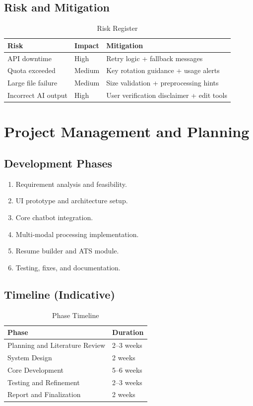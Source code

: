 \documentclass[12pt,a4paper]{report}
\begin{document}
\section{Risk and Mitigation}
\begin{table}[H]
\centering
\caption{Risk Register}
\begin{tabular}{|p{1.6in}|p{1.2in}|p{2.2in}|}
\hline
\textbf{Risk} & \textbf{Impact} & \textbf{Mitigation} \\
\hline
API downtime & High & Retry logic + fallback messages \\
\hline
Quota exceeded & Medium & Key rotation guidance + usage alerts \\
\hline
Large file failure & Medium & Size validation + preprocessing hints \\
\hline
Incorrect AI output & High & User verification disclaimer + edit tools \\
\hline
\end{tabular}
\end{table}

\chapter{Project Management and Planning}
\section{Development Phases}
\begin{enumerate}
  \item Requirement analysis and feasibility.
  \item UI prototype and architecture setup.
  \item Core chatbot integration.
  \item Multi-modal processing implementation.
  \item Resume builder and ATS module.
  \item Testing, fixes, and documentation.
\end{enumerate}

\section{Timeline (Indicative)}
\begin{table}[H]
\centering
\caption{Phase Timeline}
\begin{tabular}{|p{2.6in}|p{1.8in}|}
\hline
\textbf{Phase} & \textbf{Duration} \\
\hline
Planning and Literature Review & 2--3 weeks \\
\hline
System Design & 2 weeks \\
\hline
Core Development & 5--6 weeks \\
\hline
Testing and Refinement & 2--3 weeks \\
\hline
Report and Finalization & 2 weeks \\
\hline
\end{tabular}
\end{table}
\end{document}

